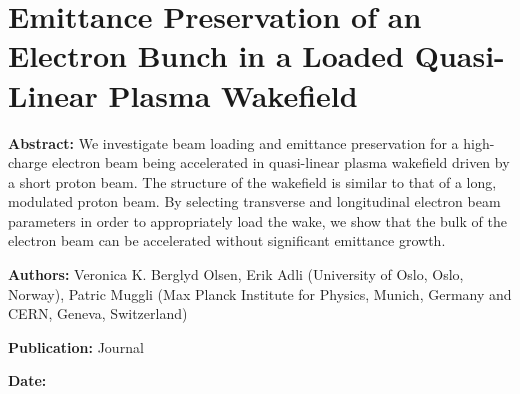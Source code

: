 %
%

\chapter{Emittance Preservation of an Electron Bunch in a Loaded Quasi-Linear Plasma Wakefield}
\label{Pub:BL17}

\begin{hangparas}{10mm}{1}

    \textbf{Abstract:}
    We investigate beam loading and emittance preservation for a high-charge electron beam being accelerated in
    quasi-linear plasma wakefield driven by a short proton beam. The structure of the wakefield is similar to that of a
    long, modulated proton beam. By selecting transverse and longitudinal electron beam parameters in order to
    appropriately load the wake, we show that the bulk of the electron beam can be accelerated without significant
    emittance growth.

    \vspace{8mm}

    \textbf{Authors:}
    Veronica K. Berglyd Olsen, Erik Adli (University of Oslo, Oslo, Norway),
    Patric Muggli (Max Planck Institute for Physics, Munich, Germany and CERN, Geneva, Switzerland)

    \vspace{5mm}

    \textbf{Publication:}
    Journal

    \vspace{5mm}

    \textbf{Date:}

\end{hangparas}
